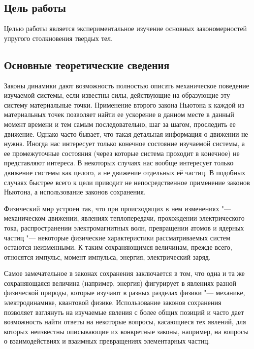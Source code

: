\documentclass[a4paper, 12pt]{extarticle}
\begin{document}
\MTDTitlePage
\MTDInfoPage

\setcounter{section}{4}

\subsection{Цель работы}
Целью работы является экспериментальное изучение основных закономерностей упругого столкновения твердых тел.

\subsection{Основные теоретические сведения}

Законы динамики дают возможность полностью описать механическое поведение изучаемой системы, если известны силы, действующие на образующие эту систему материальные точки. Применение второго закона Ньютона к каждой из материальных точек позволяет найти ее ускорение в данном месте в данный момент времени и тем самым последовательно, шаг за шагом, проследить ее движение. Однако часто бывает, что такая детальная информация о движении не нужна.
Иногда нас интересует только конечное состояние изучаемой системы, а ее промежуточные состояния (через которые система проходит в конечное) %
не представляют интереса. В некоторых случаях нас вообще интересует только движение системы как целого, а не движение отдельных её частиц. %
В подобных случаях быстрее всего к цели приводит не непосредственное применение законов Ньютона, а использование законов сохранения.

Физический мир устроен так, что при происходящих в нем изменениях "--- механическом движении, явлениях теплопередачи, прохождении электрического тока, распространении электромагнитных волн, превращении атомов и ядерных частиц "--- некоторые физические характеристики рассматриваемых систем остаются неизменными. К таким сохраняющимся величинам, прежде всего, относятся импульс, момент импульса, энергия, электрический заряд.

 Самое замечательное в законах сохранения заключается в том, что одна и та же сохраняющаяся величина (например, энергия)  %
 фигурирует в явлениях разной физической природы, которые изучают в разных разделах физики "--- механике, электродинамике, квантовой физике. Использование законов сохранения позволяет взглянуть на изучаемые явления с более общих позиций и часто дает возможность найти ответы на некоторые вопросы, касающиеся тех явлений, для которых %
 неизвестны описывающие их конкретные законы, например, на вопросы о взаимодействиях и взаимных превращениях элементарных частиц. %
\end{document}
